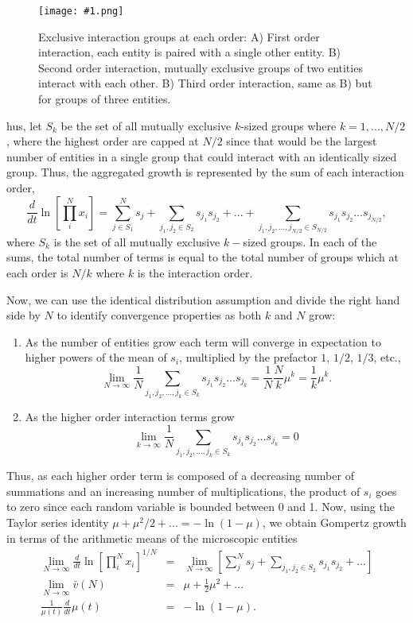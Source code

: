 \documentclass{article}
\newcommand{\insertPngFig}[3]{
  \begin{figure}[H]
  \centering
  \texttt{[image: \#1.png]}
  \caption{#2}
  \label{fig:#1}
  \end{figure}
}
\begin{document}
\insertPngFig{order}{Exclusive interaction groups at each order: A) First order interaction, each entity is paired with a single other entity. B) Second order interaction, mutually exclusive groups of two entities interact with each other. B) Third order interaction, same as B) but for groups of three entities.} 

Thus, let $S_k$ be the set of all mutually exclusive $k$-sized groups where $k=1,..., N/2$, where the highest order are capped at $N/2$ since that would be the largest number of entities in a single group that could interact with an identically sized group. Thus, the aggregated growth is represented by the sum of each interaction order,
\begin{equation}
\label{eq:MicroGomp0}
\frac{d}{dt} \ln \left[ \prod_i^N x_i \right ] = \sum_{j\in S_1}^N s_{j} + \sum_{j_1, j_2 \in S_2} s_{j_1}s_{j_2} + ... + \sum_{j_1, j_2, ..., j_{N/2} \in S_{N/2}} s_{j_1}s_{j_2}\dots s_{j_{N/2}},
\end{equation}
where $S_k$ is the set of all mutually exclusive $k-$sized groups. In each of the sums, the total number of terms is equal to the total number of groups which at each order is $N/k$ where $k$ is the interaction order. 

Now, we can use the identical distribution assumption and divide the right hand side by $N$ to identify convergence properties as both $k$ and $N$ grow:
\begin{enumerate}
\item As the number of entities grow each term will converge in expectation to higher powers of the mean of $s_i$, multiplied by the prefactor $1$, $1/2$, $1/3$, etc., 
\begin{equation}
\label{eq:MicroGomp11}
\lim_{N\rightarrow \infty} \frac{1}{N}\sum_{j_1, j_2, ..., j_k \in S_k} s_{j_1}s_{j_2}\dots s_{j_k} = \frac{1}{N}\frac{N}{k} \mu^{k} = \frac{1}{k} \mu^{k}.
\end{equation}
\item As the higher order interaction terms grow
\begin{equation}
\label{eq:MicroGomp12}
\lim_{k\rightarrow \infty} \frac{1}{N}\sum_{j_1, j_2, ..., j_k \in S_k} s_{j_1}s_{j_2}\dots s_{j_k} = 0
\end{equation}
\end{enumerate}
Thus, as each higher order term is composed of a decreasing number of summations and an increasing number of multiplications, the product of $s_i$ goes to zero since each random variable is bounded between 0 and 1. 
Now, using the Taylor series identity $\mu+\mu^2/2+... = -\ln(1-\mu)$, we obtain Gompertz growth in terms of the arithmetic means of the microscopic entities
\begin{eqnarray}
\label{eq:MicroGomp13}
\lim_{N\rightarrow \infty}\frac{d}{dt} \ln \left[ \prod_i^N x_i \right ]^{1/N} &=&  \lim_{N\rightarrow \infty}\left[\sum_j^N s_{j} + \sum_{j_1, j_2 \in S_2} s_{j_1}s_{j_2} + ...\right]\\
\lim_{N\rightarrow \infty} \bar{v}(N)  &=&  \mu + \frac{1}{2} \mu^2 + ...\\
\frac{1}{\mu(t)}\frac{d}{dt}\mu(t) &=& - \ln (1-\mu). 
\end{eqnarray}
\end{document}
